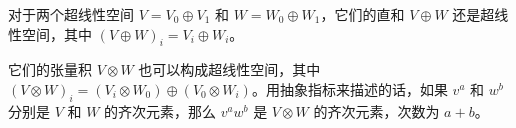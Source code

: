 对于两个超线性空间 $V=V_0\oplus V_1$ 和 $W=W_0\oplus W_1$，它们的直和 $V\oplus W$ 还是超线性空间，其中 $(V\oplus W)_i=V_i\oplus W_i$。

它们的张量积 $V\otimes W$ 也可以构成超线性空间，其中 $(V\otimes W)_i=(V_i\otimes W_0)\oplus(V_0\otimes W_i)$。用抽象指标来描述的话，如果 $v^a$ 和 $w^b$ 分别是 $V$ 和 $W$ 的齐次元素，那么 $v^aw^b$ 是 $V\otimes W$ 的齐次元素，次数为 $a+b$。























